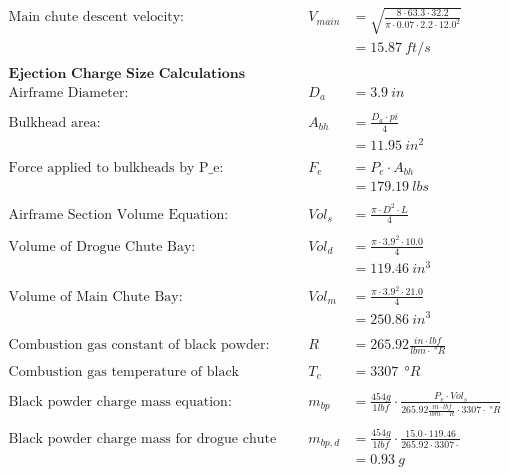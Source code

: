 \documentclass{article}
\begin{document}
\begin{align*}
		\text{Main chute descent velocity:}& &V_{main} &= \sqrt{\frac{8 \cdot 63.3 \cdot 32.2}{\pi \cdot 0.07 \cdot 2.2 \cdot 12.0^{2}}} \\
		&& &= \SI{15.87}{ft/s} \\ \\
		\textbf{Ejection Charge Size Calculations} \\
		\text{Airframe Diameter:}& &D_{a} &= \SI{3.9}{in} \\ \\
		\text{Bulkhead area:}& & A_{bh} &= \frac{D_{a} \cdot pi}{4} \tag{eqn. 13} \\
		&& &= \SI{11.95}{in^2} \\ \\
		\text{Force applied to bulkheads by P\_{e}:}& &F_{e} &= P_{e} \cdot A_{bh} \\
		&& &= \SI{179.19}{lbs} \\ \\
		\text{Airframe Section Volume Equation:}& &Vol_{s} &= \frac{ \pi \cdot D^{2} \cdot L}{4} \tag{eqn. 14} \\ \\
		\text{Volume of Drogue Chute Bay:}&&Vol_{d} &= \frac{\pi \cdot 3.9^{2} \cdot10.0}{4} \\
		&& &= \SI{119.46}{in^3} \\ \\
		\text{Volume of Main Chute Bay:}&&Vol_{m} &= \frac{\pi \cdot 3.9^{2} \cdot21.0}{4} \\
		&& &= \SI{250.86}{in^3} \\ \\
		\text{Combustion gas constant of black powder:}& &R &= 265.92 \frac{in \cdot lbf}{lbm \cdot \SI{}{\degree R}} \\ \\
		\text{Combustion gas temperature of black powder:}& &T_{c} &= 3307 \: \SI{}{\degree R} \\ \\
		\text{Black powder charge  mass equation:}& &m_{bp} &= \frac{454 g}{1 lbf} \cdot \frac{P_{e} \cdot Vol_{s}}{265.92 \frac{in \cdot lbf}{lbm \cdot \SI{}{\degree R}} \cdot 3307 \cdot \SI{}{\degree R}} \tag{eqn. 15} \\ \\
		\text{Black powder charge mass for drogue chute bay:}& &m_{bp,d} &= \frac{454 g}{1 lbf} \cdot \frac{15.0 \cdot 119.46}{265.92  \cdot 3307 \cdot} \\
		&& &= \SI{0.93}{g} \\ \\

\end{align*}
\end{document}
